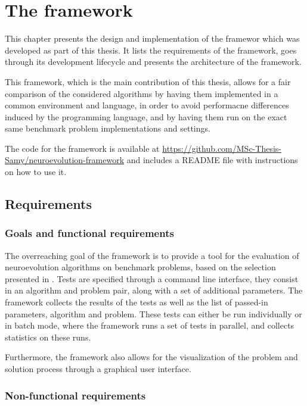 \chapter{The framework}
\label{chap:framework}

This chapter presents the design and implementation of the framewor which was developed as part of this thesis.
It lists the requirements of the framework, goes through its development lifecycle and presents the architecture of the framework.

This framework, which is the main contribution of this thesis, allows for a fair comparison of the considered algorithms by having them implemented in a common environment
and language, in order to avoid performacne differences induced by the programming language, and by having them run on the exact same benchmark problem implementations and
settings.

The code for the framework is available at \url{https://github.com/MSc-Thesis-Samy/neuroevolution-framework} and includes a README file with instructions on how to use it.

\section{Requirements}

\subsection{Goals and functional requirements}

The overreaching goal of the framework is to provide a tool for the evaluation of neuroevolution algorithms on benchmark problems, based on the selection
presented in .
Tests are specified through a command line interface, they consist in an algorithm and problem pair, along with a set of additional parameters.
The framework collects the results of the tests as well as the list of passed-in parameters, algorithm and problem.
These tests can either be run individually or in batch mode, where the framework runs a set of tests in parallel, and collects statistics on these runs.

Furthermore, the framework also allows for the visualization of the problem and solution process through a graphical user interface.

\subsection{Non-functional requirements}

